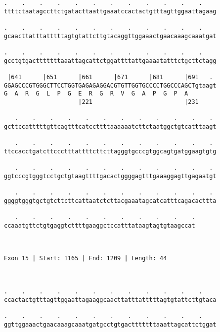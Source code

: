 \documentclass{article}
\begin{document}
\begin{Verbatim}
.    .    .    .    .    .    .    .    .    .    .    .    
ttttctaatagccttctgatacttaattgaaatccactactgtttagttggaattagaag
                                                            
.    .    .    .    .    .    .    .    .    .    .    .    
gcaacttatttatttttagtgtattcttgtacaggttggaaactgaacaaagcaaatgat
                                                            
.    .    .    .    .    .    .    .    .    .    .    .    
gcctgtgactttttttaaattagcattctggattttattgaaaatatttctgcttctagg
                                                            
 |641      |651      |661      |671      |681      |691   . 
GGAGCCCGTGGGCTTCCTGGTGAGAGAGGACGTGTTGGTGCCCCTGGCCCAGCTgtaagt
G  A  R  G  L  P  G  E  R  G  R  V  G  A  P  G  P  A        
                     |221                          |231     
  
   .    .    .    .    .    .    .    .    .    .    .    . 
gcttccatttttgttcagtttcatccttttaaaaaatcttctaatggctgtcatttaagt
                                                            
   .    .    .    .    .    .    .    .    .    .    .    . 
ttccacctgatcttccctttattttcttcttagggtgcccgtggcagtgatggaagtgtg
                                                            
   .    .    .    .    .    .    .    .    .    .    .    . 
ggtcccgtgggtcctgctgtaagttttgacactggggagtttgaaaggagttgagaatgt
                                                            
   .    .    .    .    .    .    .    .    .    .    .    . 
ggggtgggtgctgtcttcttcattaatctcttacgaaatagcatcatttcagacacttta
                                                            
   .    .    .    .    .    .    .    .    .    .    .
ccaaatgttctgtgaggtcttttgaaggctccatttataagtagtgtaagccat
                                                      
                                                      
 
Exon 15 | Start: 1165 | End: 1209 | Length: 44



.    .    .    .    .    .    .    .    .    .    .    .    
ccactactgtttagttggaattagaaggcaacttatttatttttagtgtattcttgtaca
                                                            
.    .    .    .    .    .    .    .    .    .    .    .    
ggttggaaactgaacaaagcaaatgatgcctgtgactttttttaaattagcattctggat
                                                            

\end{Verbatim}
\end{document}
